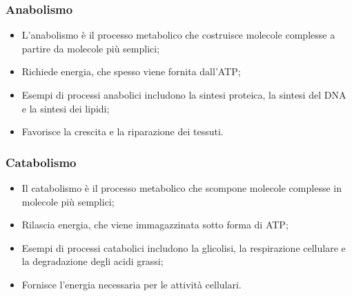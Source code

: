 \documentclass{article}
\begin{document}
\begin{center}
\end{center}

\subsubsection{Anabolismo}
\begin{itemize}
    \item L'anabolismo è il processo metabolico che costruisce molecole complesse a partire da
        molecole più semplici;
    \item Richiede energia, che spesso viene fornita dall'ATP;
    \item Esempi di processi anabolici includono la sintesi proteica, la sintesi del DNA e la
        sintesi dei lipidi;
    \item Favorisce la crescita e la riparazione dei tessuti.
\end{itemize}

\subsubsection{Catabolismo}
\begin{itemize}
    \item Il catabolismo è il processo metabolico che scompone molecole complesse in molecole
        più semplici;
    \item Rilascia energia, che viene immagazzinata sotto forma di ATP;
    \item Esempi di processi catabolici includono la glicolisi, la respirazione cellulare e la
        degradazione degli acidi grassi;
    \item Fornisce l'energia necessaria per le attività cellulari.
\end{itemize}
\end{document}
